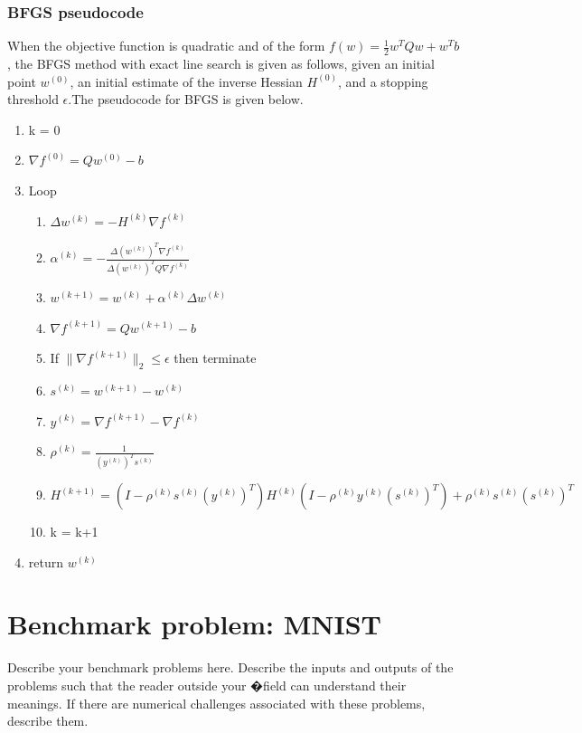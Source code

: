 \documentclass[10pt,twocolumn]{article}
\begin{document}
\subsubsection{BFGS pseudocode}
When the objective function is quadratic and of the form $f(w) = \frac{1}{2}w^T Q w + w^T b$, the BFGS method with exact line search is given as follows, given an initial point $w^{(0)}$, an initial estimate of the inverse Hessian $H^{(0)}$, and a stopping threshold $\epsilon$.The pseudocode for BFGS is given below. \\
\begin{enumerate}
\item k = 0
\item $\nabla f^{(0)} = Qw^{(0)} - b$
\item Loop
\begin{enumerate}[label={(\roman*)},leftmargin=2\parindent]
\item $\Delta w^{(k)} = - H^{(k)}\nabla f^{(k)}$
\item $\alpha^{(k)}= -\frac{\Delta (w^{(k)})^T \nabla f^{(k)} }{\Delta (w^{(k)})^T Q \nabla f^{(k)}}$
\item $w^{(k+1)} = w^{(k)} + \alpha^{(k)}\Delta w^{(k)}$
\item $\nabla f^{(k+1)} = Qw^{(k+1)} - b$
\item If $\lVert  \nabla f^{(k+1)} \rVert_{2} \leq \epsilon$ then terminate
\item $s^{(k)} = w^{(k+1)} - w^{(k)}$
\item $y ^{(k)} =  \nabla f^{(k+1)}  -  \nabla f^{(k)} $
\item $\rho^{(k)} = \frac{1}{(y^{(k)})^Ts^{(k)}}$
\item $H^{(k+1)} = (I - \rho^{(k)} s^{(k)}(y^{(k)})^T)H^({k}) (I - \rho^{(k)} y^{(k)}(s^{(k)})^T) +\rho^{(k)} s^{(k)}(s^{(k)})^T $
\item k = k+1
\end{enumerate}
\item return $w^{(k)}$
\end{enumerate}


\section{Benchmark problem: MNIST}

Describe your benchmark problems here. Describe the inputs and outputs of the problems such that the reader outside your �field can understand their meanings. If there are numerical challenges associated with these problems, describe them.
\end{document}
